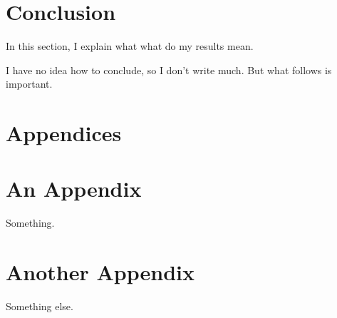 \documentclass[
  11pt,
  twoside,
  11pt]{article}
\numberwithin{Theorem}{section}
\numberwithin{Definition}{section}
\numberwithin{Lemma}{section}
\numberwithin{Algorithm}{section}
\numberwithin{equation}{section}
\begin{document}
\clearpage

\section{Conclusion}
\label{sec:conclusion}
In this section, I explain what what do my results mean.

I have no idea how to conclude, so I don't write much. But what follows is important.
\clearpage


\clearpage

\appendix
\section*{Appendices}

\section{An Appendix}
\label{app:one}

Something.
\clearpage

\section{Another Appendix}
\label{app:two}

Something else.
\end{document}
